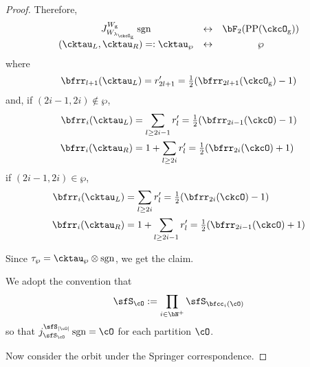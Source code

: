 \documentclass[12pt,a4paper]{amsart}
\def\abs#1{\left|{#1}\right|}
\newcommand{\sgn}{\operatorname{sgn}}
\numberwithin{equation}{section}
\theoremstyle{remark}
\def\half{{\tfrac{1}{2}}}
\def\lamckg{\lambda_{\ckcO_{\mathrm g}}}
\def\CPP{\mathrm{PP}}
\begin{document}
\begin{proof}
{      Therefore,
      \[
        \begin{array}{ccc}
          J_{W_{\lamckg}}^{W_{\mathrm g}} \sgn
          &\leftrightarrow&  \bF_{2}(\CPP(\ckcO_{\mathrm g}))\\
          (\cktau_{L},\cktau_{R}) =:\cktau_{\wp}&\leftrightarrow & \wp
        \end{array}
      \]
      where
      \[
        \bfrr_{l+1}(\cktau_{L}) = r'_{2l+1} = \half (\bfrr_{2l+1}(\ckcO_{\mathrm g})-1)
      \]
      and, if $(2i-1,2i)\notin \wp$,
      \[
        \begin{split}
          \bfrr_{i}(\cktau_{L}) & = \sum_{l\geq 2i-1} r'_{l}
          = \half(\bfrr_{2i-1}(\ckcO)-1)\\
          \bfrr_{i}(\cktau_{R}) & = 1 + \sum_{l\geq 2i} r'_{l} = \half(\bfrr_{2i}(\ckcO)+1)
        \end{split}
      \]
      if $(2i-1,2i)\in \wp$,
      \[
        \begin{split}
          \bfrr_{i}(\cktau_{L}) & = \sum_{l\geq 2i} r'_{l}
          = \half(\bfrr_{2i}(\ckcO)-1)\\
          \bfrr_{i}(\cktau_{R}) & = 1 + \sum_{l\geq 2i-1} r'_{l} = \half(\bfrr_{2i-1}(\ckcO)+1)
        \end{split}
      \]


      Since $\tau_{\wp} = \cktau_{\wp}\otimes \sgn$, we get the claim.

      We adopt the convention that
      \[
        \sfS_{\cO} := \prod_{i\in \bN^{+}}\sfS_{\bfcc_{i}(\cO)}
      \]
      so that $j_{\sfS_{\cO}}^{\sfS_{\abs{\cO}}}\sgn = \cO$ for each partition
      $\cO$.

      Now consider the orbit under the Springer correspondence.

}
\end{proof}
\end{document}
